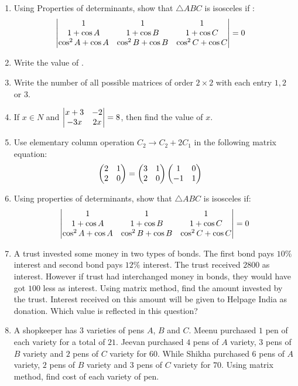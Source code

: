\begin{enumerate}
    \item Using Properties of determinants, show that $\triangle ABC$ is isosceles if :
          \begin{align*}
              \begin{vmatrix}
              1                 & 1                 & 1                       \\
              1+\cos A          & 1+ \cos B         & 1+ \cos C               \\
              \cos^2 A + \cos A & \cos^2 B + \cos B & \cos^2 C + \cos C\end{vmatrix} & =0
          \end{align*}
    \item Write the value of
          .
\item Write the number of all possible matrices of order $2\times2$ with each entry $1, 2$ or $3$.
\item If $ x \in N$ and $\begin{vmatrix}x+3 & -2 \\ -3x & 2x\end{vmatrix} = 8$, then find the value of $x$.
\item Use elementary column operation $ C_2 \rightarrow C_2  + 2C_1$ in the following matrix equation:
	\begin{align*} \begin{pmatrix}2 & 1 \\ 2 & 0\end{pmatrix} &= \begin{pmatrix}3 & 1 \\ 2 & 0\end{pmatrix}\begin{pmatrix}1 & 0 \\ -1 & 1\end{pmatrix} \end{align*}
\item Using properties of determinants, show that $\triangle{ABC}$ is isosceles if:
	\begin{align*}\begin{vmatrix}1 & 1 & 1 \\ 1 + \cos{A} & 1 + \cos{B} & 1 + \cos{C} \\ \cos^2{A} + \cos{A} & \cos^2{B} + \cos{B} & \cos^2{C} + \cos{C} \end{vmatrix} = 0\end{align*}	
\item A trust invested some money in two types of bonds. The first bond pays $10\%$ interest and second bond pays $12\%$ interest. The trust received \rupee$2800$ as interest. However if trust had interchanged money in bonds, they would have got \rupee$100$ less as interest. Using matrix method, find the amount invested by the trust. Interest received on this amount will be given to Helpage India as donation. Which value is reflected in this question?
\item A shopkeeper has $3$ varieties of pens $A$, $B$ and $C$. Meenu purchased $1$ pen of each variety for a total of \rupee$21$. Jeevan purchased $4$ pens of $A$ variety, $3$ pens of $B$ variety and $2$ pens of $C$ variety for \rupee$60$. While Shikha purchased $6$ pens of $A$ variety, $2$ pens of $B$ variety and $3$ pens of $C$ variety for \rupee$70$. Using matrix method, find cost of each variety of pen.

\end{enumerate}
